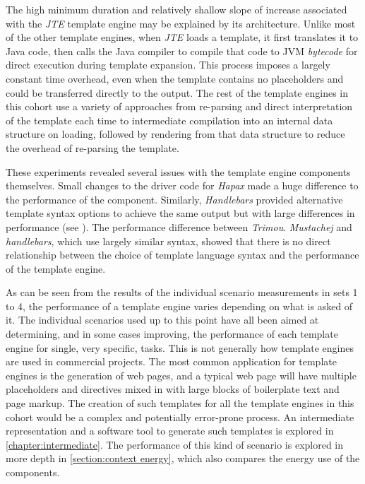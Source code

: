 The high minimum duration and relatively shallow slope of increase associated with the \emph{JTE} \gls{template engine} may be explained by its architecture. Unlike most of the other \gls{template engine}s, when \emph{JTE} loads a template, it first translates it to Java code, then calls the Java compiler to compile that code to JVM \emph{bytecode} for direct execution during template expansion. This process imposes a largely constant time overhead, even when the template contains no placeholders and could be transferred directly to the output. The rest of the \gls{template engine}s in this cohort use a variety of approaches from re-parsing and direct interpretation of the template each time to intermediate compilation into an internal data structure on loading, followed by rendering from that data structure to reduce the overhead of re-parsing the template.

\label{A160}
These experiments revealed several issues with the \gls{template engine} components themselves. Small changes to the driver code for \emph{Hapax} made a huge difference to the performance of the component. Similarly, \emph{Handlebars} provided alternative template syntax options to achieve the same output but with large differences in performance (see \pageref{small changes}). The performance difference between \emph{Trimou}. \emph{Mustachej} and \emph{handlebars}, which use largely similar syntax, showed that there is no direct relationship between the choice of \gls{template language} syntax and the performance of the \gls{template engine}.

As can be seen from the results of the individual scenario measurements in sets 1 to 4, the performance of a \gls{template engine} varies depending on what is asked of it. The individual scenarios used up to this point have all been aimed at determining, and in some cases improving, the performance of each \gls{template engine} for single, very specific, tasks. This is not generally how \gls{template engine}s are used in commercial projects. The most common application for \gls{template engine}s is the generation of web pages, and a typical web page will have multiple placeholders and directives mixed in with large blocks of boilerplate text and page markup. The creation of such templates for all the \gls{template engine}s in this cohort would be a complex and potentially error-prone process. An intermediate representation and a software tool to generate such templates is explored in \autoref{chapter:intermediate}. The performance of this kind of scenario is explored in more depth in \autoref{section:context energy}, which also compares the energy use of the components.

